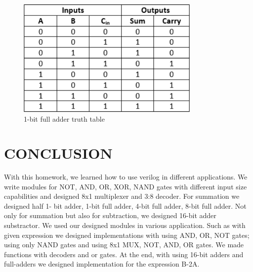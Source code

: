 \documentclass[pdftex,12pt,a4paper]{article}
\begin{document}
    \begin{figure}[H]
    	\centering
    	\includegraphics[width=0.8\textwidth]{truth tables/one.png}	
    	\caption{1-bit full adder truth table}
    	\label{1-bit full adder truth table}
    \end{figure}
    
\pagebreak

\section{CONCLUSION}
With this homework, we learned how to use verilog in different applications. We write modules for NOT, AND, OR, XOR, NAND gates with different input size capabilities and designed 8x1 multiplexer and 3:8 decoder. For summation we designed half 1- bit adder, 1-bit full adder, 4-bit full adder, 8-bit full adder. Not only for summation but also for subtraction, we designed 16-bit adder substractor. We used our designed modules in various application. Such as with given expression we designed implementations with using AND, OR, NOT gates; using only NAND gates and using 8x1 MUX, NOT, AND, OR gates. We made functions with decoders and or gates. At the end, with using 16-bit adders and full-adders we designed implementation for the expression B-2A.
\end{document}
